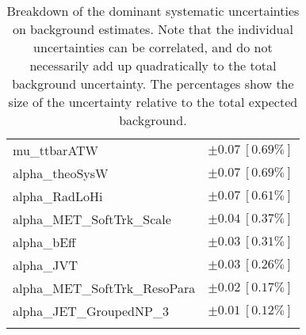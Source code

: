 \begin{table}
\begin{center}
\begin{tabular*}{\textwidth}{@{\extracolsep{\fill}}lc}
mu\_ttbarATW         & $\pm 0.07\ [0.69\%] $       \\
alpha\_theoSysW         & $\pm 0.07\ [0.69\%] $       \\
alpha\_RadLoHi         & $\pm 0.07\ [0.61\%] $       \\
alpha\_MET\_SoftTrk\_Scale         & $\pm 0.04\ [0.37\%] $       \\
alpha\_bEff         & $\pm 0.03\ [0.31\%] $       \\
alpha\_JVT         & $\pm 0.03\ [0.26\%] $       \\
alpha\_MET\_SoftTrk\_ResoPara         & $\pm 0.02\ [0.17\%] $       \\
alpha\_JET\_GroupedNP\_3         & $\pm 0.01\ [0.12\%] $       \\
\noalign{\smallskip}\hline\noalign{\smallskip}
\end{tabular*}
\end{center}
\caption[Breakdown of uncertainty on background estimates]{
Breakdown of the dominant systematic uncertainties on background estimates.
Note that the individual uncertainties can be correlated, and do not necessarily add up quadratically to 
the total background uncertainty. The percentages show the size of the uncertainty relative to the total expected background.
\label{table.results.bkgestimate.uncertainties.SRA_TW}}
\end{table}
%